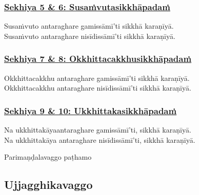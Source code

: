 \subsubsection*{\hyperref[training5-6]{Sekhiya 5 \& 6: Susaṁvutasikkhāpadaṁ}}
\label{sekh5-6}

Susaṁvuto antaraghare gamissāmī'ti sikkhā karaṇīyā.\\
Susaṁvuto antaraghare nisīdissāmī'ti sikkhā karaṇīyā.



\subsubsection*{\hyperref[training7-8]{Sekhiya 7 \& 8: Okkhittacakkhusikkhāpadaṁ}}
\label{sekh7-8}

Okkhittacakkhu antaraghare gamissāmī'ti sikkhā karaṇīyā.\\
Okkhittacakkhu antaraghare nisīdissāmī'ti sikkhā karaṇīyā.



\subsubsection*{\hyperref[training9-10]{Sekhiya 9 \& 10: Ukkhittakasikkhāpadaṁ}}
\label{sekh9-10}

Na ukkhittakāya\makeatletter\hyperlink{endnote473-appendix}\makeatother \thinspace antaraghare gamissāmī'ti, sikkhā karaṇīyā.\\
Na ukkhittakāya antaraghare nisīdissāmī'ti, sikkhā karaṇīyā.

\begin{center}
	Parimaṇḍalavaggo paṭhamo\makeatletter\hyperlink{endnote474-appendix}\makeatother \thinspace
\end{center}



\subsection{Ujjagghikavaggo}

